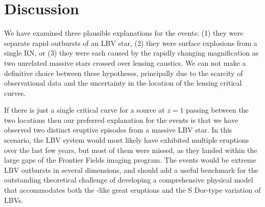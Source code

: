 \section{Discussion}\label{sec:Discussion}

We have examined three plausible explanations for the \spock events:
(1) they were separate rapid outbursts of an LBV star, (2) they were
surface explosions from a single RN, or (3) they were each caused by
the rapidly changing magnification as two unrelated massive stars
crossed over lensing caustics. We can not make a definitive choice
between these hypotheses, principally due to the scarcity of
observational data and the uncertainty in the location of the
lensing critical curves.

If there is just a single critical curve for a source at $z=1$ passing
between the two \spock locations then our preferred explanation for
the \spock events is that we have observed two distinct eruptive
episodes from a massive LBV star.
In this scenario, the \spock LBV system would most likely
have exhibited multiple eruptions over the last few years, but most of
them were missed, as they landed within the large gaps of the \HST
Frontier Fields imaging program.
The \spock events would be extreme LBV outbursts in several
dimensions, and should add a useful benchmark for the outstanding
theoretical challenge of developing a comprehensive physical model
that accommodates both the \etacar-like great eruptions and the S
Dor-type variation of LBVs.

